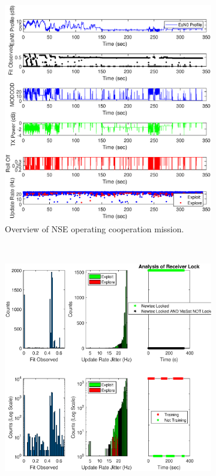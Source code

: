 \begin{figure}[ht]
\centering
\begin{subfigure}{\linewidth}
	\centering
	\includegraphics[scale=0.5]{figures/c_sim_results/sim22_NSE_overview_coop.eps}
	\caption{Overview of NSE operating cooperation mission.}
	\label{fig:cSimNSEOverview}
\end{subfigure}\\
\begin{subfigure}{\linewidth}
	\centering
	\includegraphics[scale=0.5]{figures/c_sim_results/sim22_NSE_hists_coop.eps}

\end{subfigure}
\end{figure}
